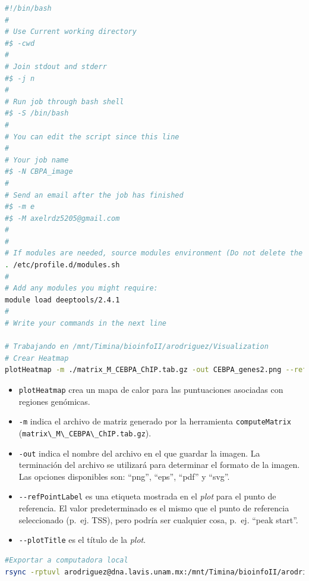 \documentclass[
]{article}
\newcommand{\passthrough}[1]{#1}
\providecommand{\tightlist}{%
  \setlength{\itemsep}{0pt}\setlength{\parskip}{0pt}}
\begin{document}
\begin{lstlisting}[language=bash]
#!/bin/bash
#
# Use Current working directory
#$ -cwd
#
# Join stdout and stderr
#$ -j n
#
# Run job through bash shell
#$ -S /bin/bash
#
# You can edit the script since this line
#
# Your job name
#$ -N CBPA_image
#
# Send an email after the job has finished
#$ -m e
#$ -M axelrdz5205@gmail.com
#
#
# If modules are needed, source modules environment (Do not delete the next line):
. /etc/profile.d/modules.sh
#
# Add any modules you might require:
module load deeptools/2.4.1
#
# Write your commands in the next line

# Trabajando en /mnt/Timina/bioinfoII/arodriguez/Visualization
# Crear Heatmap
plotHeatmap -m ./matrix_M_CEBPA_ChIP.tab.gz -out CEBPA_genes2.png --refPointLabel TSS --regionsLabel genes --plotTitle 'CEBPA signal'
\end{lstlisting}

\begin{itemize}
\tightlist
\item
  \passthrough{\lstinline!plotHeatmap!} crea un mapa de calor para las
  puntuaciones asociadas con regiones genómicas.
\item
  \passthrough{\lstinline!-m!} indica el archivo de matriz generado por
  la herramienta \passthrough{\lstinline!computeMatrix!}
  (\passthrough{\lstinline!matrix\_M\_CEBPA\_ChIP.tab.gz!}).
\item
  \passthrough{\lstinline!-out!} indica el nombre del archivo en el que
  guardar la imagen. La terminación del archivo se utilizará para
  determinar el formato de la imagen. Las opciones disponibles son:
  ``png'', ``eps'', ``pdf'' y ``svg''.
\item
  \passthrough{\lstinline!--refPointLabel!} es una etiqueta mostrada en
  el \emph{plot} para el punto de referencia. El valor predeterminado es
  el mismo que el punto de referencia seleccionado (p.~ej. TSS), pero
  podría ser cualquier cosa, p.~ej. ``peak start''.
\item
  \passthrough{\lstinline!--plotTitle!} es el título de la \emph{plot}.
\end{itemize}

\begin{lstlisting}[language=bash]
#Exportar a computadora local
rsync -rptuvl arodriguez@dna.lavis.unam.mx:/mnt/Timina/bioinfoII/arodriguez/Visualization/CEBPA_genes2.png .
\end{lstlisting}
\end{document}
